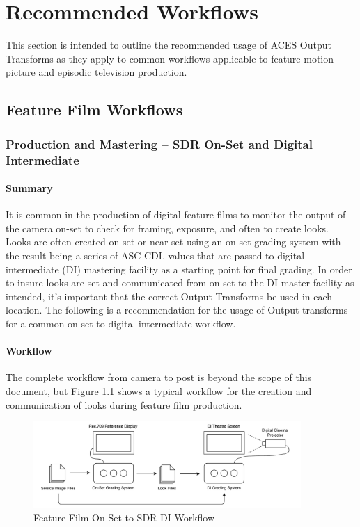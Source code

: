 \numberedformat

\clearpage
\chapter{Recommended Workflows}
\label{ch:rec-workflows}
This section is intended to outline the recommended usage of ACES Output Transforms as they apply to common workflows applicable to feature motion picture and episodic television production.

\section{Feature Film Workflows}

\subsection{Production and Mastering -- SDR On-Set and Digital Intermediate}

\subsubsection{Summary}
It is common in the production of digital feature films to monitor the output of the camera on-set to check for framing, exposure, and often to create looks.  Looks are often created on-set or near-set using an on-set grading system with the result being a series of ASC-CDL values that are passed to digital intermediate (DI) mastering facility as a starting point for final grading.  In order to insure looks are set and communicated from on-set to the DI master facility as intended, it's important that the correct Output Transforms be used in each location.  The following is a recommendation for the usage of Output transforms for a common on-set to digital intermediate workflow.

\subsubsection{Workflow}
The complete workflow from camera to post is beyond the scope of this document, but Figure \ref{fig:workflow1} shows a typical workflow for the creation and communication of looks during feature film production.

\begin{figure}[ht!]
\centering
    \includegraphics[width=4in]{images/workflows/workflow1.pdf}
    \caption{\small Feature Film On-Set to SDR DI Workflow}
    \label{fig:workflow1}
\end{figure}

